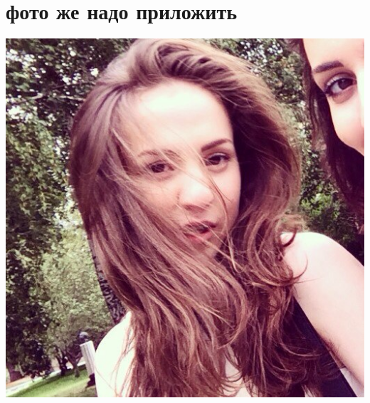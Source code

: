 \documentclass[12pt,a4paper,oneside]{article}
\begin{document}
\section{фото же надо приложить}
\includegraphics[width= 10 cm]{fotachka.jpg}
\end{document}
